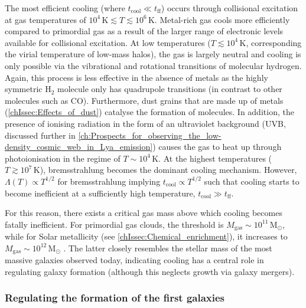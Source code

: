 The most efficient cooling (where $t_\text{cool} \ll t_\text{ff}$) occurs through collisional excitation at gas temperatures of $10^4 \, \mathrm{K} \lesssim T \lesssim 10^6 \, \mathrm{K}$. Metal-rich gas cools more efficiently compared to primordial gas as a result of the larger range of electronic levels available for collisional excitation. At low temperatures ($T \lesssim 10^4 \, \mathrm{K}$, corresponding the virial temperature of low-mass halos), the gas is largely neutral and cooling is only possible via the vibrational and rotational transitions of molecular hydrogen. Again, this process is less effective in the absence of metals as the highly symmetric $\mathrm{H_2}$ molecule only has quadrupole transitions (in contrast to other molecules such as $\mathrm{CO}$). Furthermore, dust grains that are made up of metals (\cref{chIssec:Effects_of_dust}) catalyse the formation of molecules. In addition, the presence of ionising radiation in the form of an ultraviolet background (UVB, discussed further in \cref{ch:Prospects_for_observing_the_low-density_cosmic_web_in_Lya_emission}) causes the gas to heat up through photoionisation in the regime of $T \sim 10^4 \, \mathrm{K}$. At the highest temperatures ($T \gtrsim 10^7 \, \mathrm{K}$), bremsstrahlung becomes the dominant cooling mechanism. However, $\Lambda(T) \propto T^{1/2}$ for bremsstrahlung \citep{1979rpa..book.....R} implying $t_\text{cool} \propto T^{1/2}$ such that cooling starts to become inefficient at a sufficiently high temperature, $t_\text{cool} \gg t_\text{ff}$.

For this reason, there exists a critical gas mass above which cooling becomes fatally inefficient. For primordial gas clouds, the threshold is $M_\text{gas} \sim 10^{11} \, \mathrm{M_\odot}$, while for Solar metallicity (see \cref{chIssec:Chemical_enrichment}), it increases to $M_\text{gas} \sim 10^{12} \, \mathrm{M_\odot}$ \citep[e.g.][]{1977MNRAS.179..541R, 1978MNRAS.183..341W}. The latter closely resembles the stellar mass of the most massive galaxies observed today, indicating cooling has a central role in regulating galaxy formation (although this neglects growth via galaxy mergers).

\subsubsection{Regulating the formation of the first galaxies}
\label{chIsssec:Regulating_the_formation_of_the_first_galaxies}


